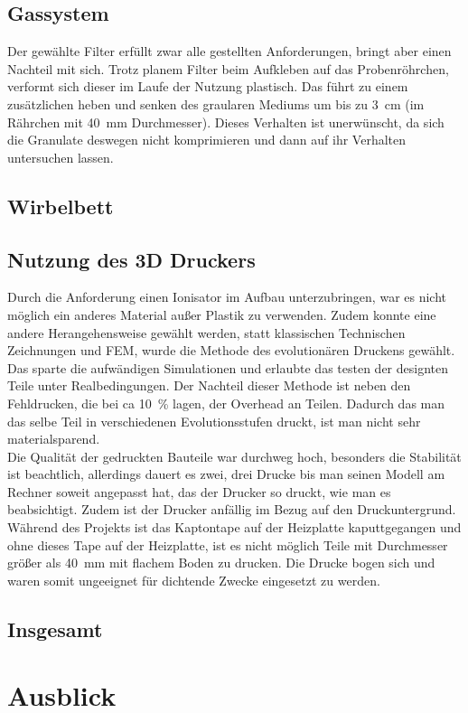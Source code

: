 \subsection{Gassystem}

Der gewählte Filter erfüllt zwar alle gestellten Anforderungen, bringt aber einen Nachteil mit sich. Trotz planem Filter beim Aufkleben auf das Probenröhrchen, verformt sich dieser im Laufe der Nutzung plastisch. Das führt zu einem zusätzlichen heben und senken des graularen Mediums um bis zu \SI{3}{cm} (im Rährchen mit \SI{40}{mm}  Durchmesser). Dieses Verhalten ist unerwünscht, da sich die Granulate deswegen nicht komprimieren und dann auf ihr Verhalten untersuchen lassen.  

\subsection{Wirbelbett}



\subsection{Nutzung des 3D Druckers}

Durch die Anforderung einen Ionisator im Aufbau unterzubringen, war es nicht möglich ein anderes Material außer Plastik zu verwenden. Zudem konnte eine andere Herangehensweise gewählt werden, statt klassischen Technischen Zeichnungen und FEM, wurde die Methode des evolutionären Druckens gewählt. Das sparte die aufwändigen Simulationen und erlaubte das testen der designten Teile unter Realbedingungen. Der Nachteil dieser Methode ist neben den  Fehldrucken, die bei ca \SI{10}{\%} lagen, der Overhead an Teilen. Dadurch das man das selbe Teil in verschiedenen Evolutionsstufen druckt, ist man nicht sehr materialsparend. \\
Die Qualität der gedruckten Bauteile war durchweg hoch, besonders die Stabilität ist beachtlich, allerdings dauert es zwei, drei Drucke bis man seinen Modell am Rechner soweit angepasst hat, das der Drucker so druckt, wie man es beabsichtigt. Zudem ist der Drucker anfällig im Bezug auf den Druckuntergrund. Während des Projekts ist das Kaptontape auf der Heizplatte kaputtgegangen und ohne dieses Tape auf der Heizplatte, ist es nicht möglich Teile mit Durchmesser größer als \SI{40}{mm} mit flachem Boden zu drucken. Die Drucke bogen sich und waren somit ungeeignet für dichtende Zwecke eingesetzt zu werden.


\subsection{Insgesamt}








\section{Ausblick}












